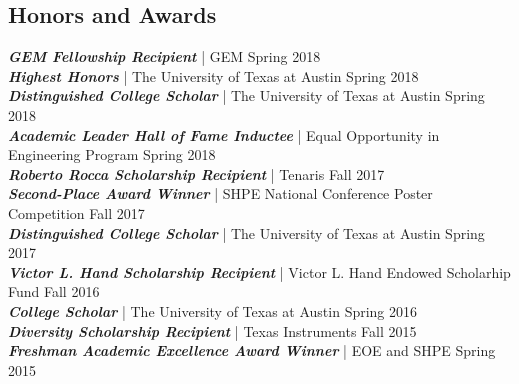 \documentclass[letter]{res}
\begin{document}
\begin{resume}
\section{Honors and Awards}
{\sl \textbf{GEM Fellowship Recipient}} | GEM \hfill Spring 2018\\
{\sl \textbf{Highest Honors}} | The University of Texas at Austin  \hfill Spring 2018\\
{\sl \textbf{Distinguished College Scholar}} | The University of Texas at Austin  \hfill Spring 2018\\
{\sl \textbf{Academic Leader Hall of Fame Inductee}} | Equal Opportunity in Engineering Program  \hfill Spring 2018\\
{\sl \textbf{Roberto Rocca Scholarship Recipient}} | Tenaris \hfill Fall 2017\\
{\sl \textbf{Second-Place Award Winner}} | SHPE National Conference Poster Competition  \hfill Fall 2017\\
{\sl \textbf{Distinguished College Scholar}} | The University of Texas at Austin  \hfill Spring 2017\\
{\sl \textbf{Victor L. Hand Scholarship Recipient}} | Victor L. Hand Endowed Scholarhip Fund \hfill Fall 2016\\
{\sl \textbf{College Scholar}} | The University of Texas at Austin \hfill Spring 2016\\
{\sl \textbf{Diversity Scholarship Recipient}} | Texas Instruments \hfill Fall 2015\\
{\sl \textbf{Freshman Academic Excellence Award Winner}} | EOE and SHPE \hfill Spring 2015\\

\end{resume}
\end{document}
